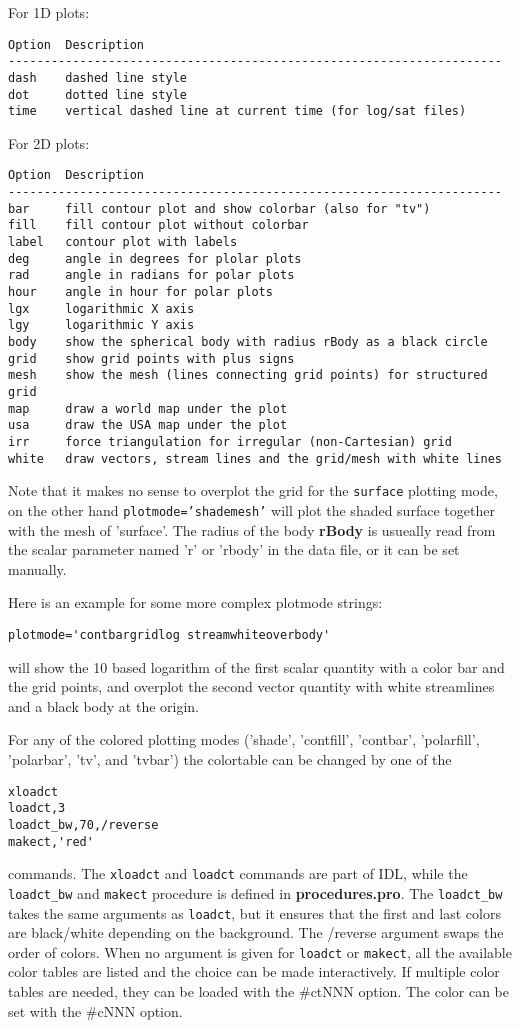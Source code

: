 \documentclass{article}
\begin{document}
For 1D plots:
\begin{verbatim}
Option  Description
---------------------------------------------------------------------
dash    dashed line style
dot     dotted line style
time    vertical dashed line at current time (for log/sat files)
\end{verbatim}

For 2D plots:
\begin{verbatim}
Option  Description
---------------------------------------------------------------------
bar     fill contour plot and show colorbar (also for "tv")
fill    fill contour plot without colorbar
label   contour plot with labels
deg     angle in degrees for plolar plots
rad     angle in radians for polar plots
hour    angle in hour for polar plots
lgx     logarithmic X axis
lgy     logarithmic Y axis
body    show the spherical body with radius rBody as a black circle
grid    show grid points with plus signs
mesh    show the mesh (lines connecting grid points) for structured grid
map     draw a world map under the plot
usa     draw the USA map under the plot
irr     force triangulation for irregular (non-Cartesian) grid
white   draw vectors, stream lines and the grid/mesh with white lines
\end{verbatim}
Note that it makes no sense to overplot the grid for the 
{\tt surface} plotting mode, on the other hand {\tt plotmode='shademesh'}
will plot the shaded surface together with the mesh of 'surface'.
The radius of the body {\bf rBody} is usueally read from the 
scalar parameter named 'r' or 'rbody' in the data file, or it can be set
manually.

Here is an example for some more complex plotmode strings:
\begin{verbatim}
plotmode='contbargridlog streamwhiteoverbody'
\end{verbatim} 
will show the 10 based logarithm of the first scalar quantity with 
a color bar and the grid points, 
and overplot the second vector quantity with white streamlines
and a black body at the origin.

For any of the colored plotting modes ('shade', 'contfill', 'contbar', 
'polarfill', 'polarbar', 'tv', and 'tvbar') the colortable can be 
changed by one of the 
\begin{verbatim}
xloadct
loadct,3
loadct_bw,70,/reverse
makect,'red'
\end{verbatim}
commands. The {\tt xloadct} and {\tt loadct} commands are part of IDL, while
the {\tt loadct\_bw} and {\tt makect} procedure is defined in
{\bf procedures.pro}.
The {\tt loadct\_bw} takes the same arguments as {\tt loadct}, but it ensures
that the first and last colors are black/white depending on the background.
The /reverse argument swaps the order of colors.
When no argument is given for {\tt loadct} or {\tt makect}, 
all the available color tables are listed
and the choice can be made interactively.
If multiple color tables are needed, they can be loaded with the \#ctNNN
option. The color can be set with the \#cNNN option. 
\end{document}

